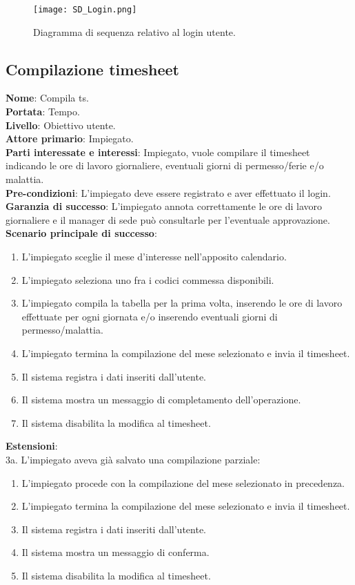 \begin{figure}[H]
	\centering
	\texttt{[image: SD\_Login.png]}
	\caption{Diagramma di sequenza relativo al login utente.}
	\label{fig:sd_login}
\end{figure}

\subsection{Compilazione timesheet}
\textbf{Nome}: Compila ts.\\
\textbf{Portata}: Tempo.\\
\textbf{Livello}: Obiettivo utente.\\
\textbf{Attore primario}: Impiegato.\\
\textbf{Parti interessate e interessi}: Impiegato, vuole compilare il timesheet indicando le ore di lavoro giornaliere, eventuali giorni di permesso/ferie e/o malattia.\\
\textbf{Pre-condizioni}: L'impiegato deve essere registrato e aver effettuato il login.\\
\textbf{Garanzia di successo}: L'impiegato annota correttamente le ore di lavoro giornaliere e il manager di sede può consultarle per l'eventuale approvazione.\\
\textbf{Scenario principale di successo}:
\begin{enumerate}
    \item L'impiegato sceglie il mese d'interesse nell'apposito calendario.
    \item L'impiegato seleziona uno fra i codici commessa disponibili.
    \item L'impiegato compila la tabella per la prima volta, inserendo le ore di lavoro effettuate per ogni giornata e/o inserendo eventuali giorni di permesso/malattia.
    \item L'impiegato termina la compilazione del mese selezionato e invia il timesheet.
    \item Il sistema registra i dati inseriti dall'utente.
    \item Il sistema mostra un messaggio di completamento dell'operazione.
    \item Il sistema disabilita la modifica al timesheet.
\end{enumerate}
\textbf{Estensioni}: \\
3a. L'impiegato aveva già salvato una compilazione parziale:
\begin{enumerate}
    \item L'impiegato procede con la compilazione del mese selezionato in precedenza.
    \item L'impiegato termina la compilazione del mese selezionato e invia il timesheet. 
    \item Il sistema registra i dati inseriti dall'utente.
    \item Il sistema mostra un messaggio di conferma.
    \item Il sistema disabilita la modifica al timesheet.
\end{enumerate}

